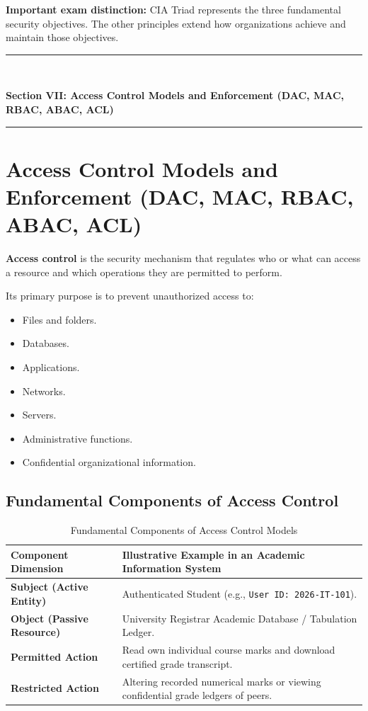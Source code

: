 \textbf{Important exam distinction:} CIA Triad represents the three fundamental security objectives. The other principles extend how organizations achieve and maintain those objectives.


\newpage
\begin{center}
\vspace{0.5em}
{\color{primary}\rule{0.45\textwidth}{1.2pt}\\[4pt]}
{\Large\bfseries\color{primary} Section VII: Access Control Models and Enforcement (DAC, MAC, RBAC, ABAC, ACL)\\[2pt]}
{\color{primary}\rule{0.45\textwidth}{1.2pt}}
\vspace{0.5em}
\end{center}

\section{Access Control Models and Enforcement (DAC, MAC, RBAC, ABAC, ACL)}


\textbf{Access control} is the security mechanism that regulates who or what can access a resource and which operations they are permitted to perform.

Its primary purpose is to prevent unauthorized access to:

\begin{itemize}
\item Files and folders.
\item Databases.
\item Applications.
\item Networks.
\item Servers.
\item Administrative functions.
\item Confidential organizational information.
\end{itemize}

\subsection{Fundamental Components of Access Control}

\begin{table}[htbp]
\centering
\caption{Fundamental Components of Access Control Models}
\label{tab:access_control_components}
\begin{tabularx}{\textwidth}{p{4.2cm} X}
\toprule
\textbf{Component Dimension} & \textbf{Illustrative Example in an Academic Information System} \\
\midrule
\textbf{Subject (Active Entity)} & Authenticated Student (e.g., \texttt{User ID: 2026-IT-101}). \\
\textbf{Object (Passive Resource)} & University Registrar Academic Database / Tabulation Ledger. \\
\textbf{Permitted Action} & Read own individual course marks and download certified grade transcript. \\
\textbf{Restricted Action} & Altering recorded numerical marks or viewing confidential grade ledgers of peers. \\
\bottomrule
\end{tabularx}
\end{table}

